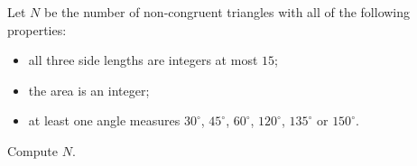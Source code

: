 Let $N$ be the number of non-congruent triangles with all of the following properties:
\begin{itemize}
\item all three side lengths are integers at most $15$;
\item the area is an integer;
\item at least one angle measures $30^\circ$, $45^\circ$, $60^\circ$, $120^\circ$, $135^\circ$ or $150^\circ$.
\end{itemize}
Compute $N$.
